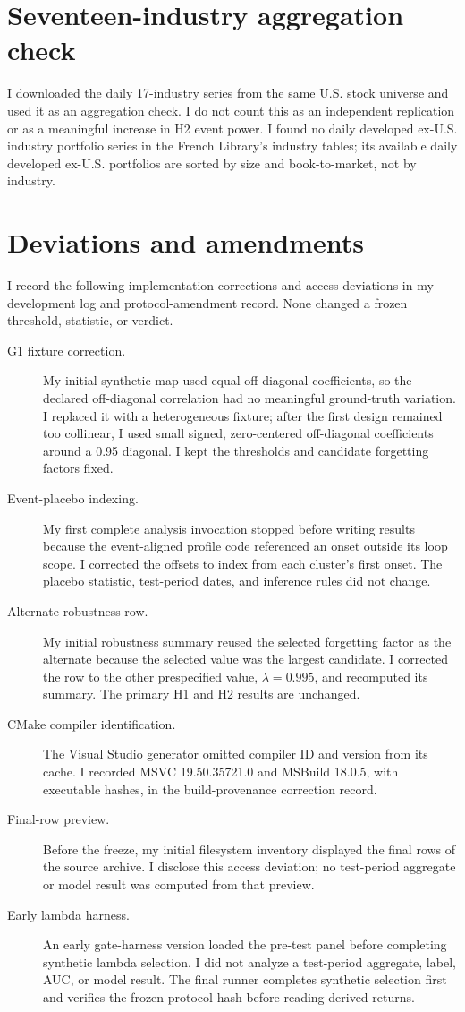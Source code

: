 \documentclass[11pt]{article}
\begin{document}
\section{Seventeen-industry aggregation check}
I downloaded the daily 17-industry series from the same U.S. stock universe and used it as an aggregation check. \PanelSeventeenSummary{} I do not count this as an independent replication or as a meaningful increase in H2 event power. I found no daily developed ex-U.S. industry portfolio series in the French Library's industry tables; its available daily developed ex-U.S. portfolios are sorted by size and book-to-market, not by industry.

\section{Deviations and amendments}\label{sec:deviations}
I record the following implementation corrections and access deviations in my development log and protocol-amendment record. None changed a frozen threshold, statistic, or verdict.

\begin{description}
\item[G1 fixture correction.] My initial synthetic map used equal off-diagonal coefficients, so the declared off-diagonal correlation had no meaningful ground-truth variation. I replaced it with a heterogeneous fixture; after the first design remained too collinear, I used small signed, zero-centered off-diagonal coefficients around a 0.95 diagonal. I kept the thresholds and candidate forgetting factors fixed.
\item[Event-placebo indexing.] My first complete analysis invocation stopped before writing results because the event-aligned profile code referenced an onset outside its loop scope. I corrected the offsets to index from each cluster's first onset. The placebo statistic, test-period dates, and inference rules did not change.
\item[Alternate robustness row.] My initial robustness summary reused the selected forgetting factor as the alternate because the selected value was the largest candidate. I corrected the row to the other prespecified value, $\lambda=0.995$, and recomputed its summary. The primary H1 and H2 results are unchanged.
\item[CMake compiler identification.] The Visual Studio generator omitted compiler ID and version from its cache. I recorded MSVC 19.50.35721.0 and MSBuild 18.0.5, with executable hashes, in the build-provenance correction record.
\item[Final-row preview.] Before the freeze, my initial filesystem inventory displayed the final rows of the source archive. I disclose this access deviation; no test-period aggregate or model result was computed from that preview.
\item[Early lambda harness.] An early gate-harness version loaded the pre-test panel before completing synthetic lambda selection. I did not analyze a test-period aggregate, label, AUC, or model result. The final runner completes synthetic selection first and verifies the frozen protocol hash before reading derived returns.
\end{description}
\end{document}
